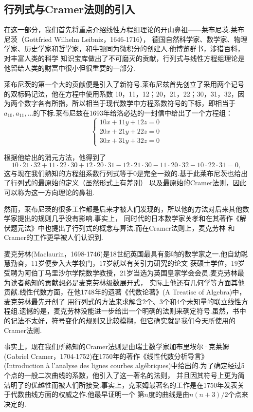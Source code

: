 \subsection{行列式与Cramer法则的引入}
在这一部分，我们首先将重点介绍线性方程组理论的开山鼻祖——莱布尼茨.莱布尼茨（Gottfried Wilhelm Leibniz，1646-1716），
德国自然科学家、数学家、物理学家、历史学家和哲学家，和牛顿同为微积分的创建人.他博览群书，涉猎百科，对丰富人类的科学
知识宝库做出了不可磨灭的贡献，行列式与线性方程组理论是他留给人类的财富中很小但很重要的一部分.

莱布尼茨的第一个大的贡献便是引入了新符号.莱布尼兹首先创立了采用两个记号的双标码记法，他在方程中使用系数
10，11，12；20，21，22；30，31，32，因为两个数字各有所指，所以相当于现代数学中方程系数符号的下标，即相当于
$a_{10},a_{11},\ldots$的下标.莱布尼兹在1693年给洛必达的一封信中给出了一个方程组：
\[\begin{cases}
    10x+11y+12z=0\\
    20x+21y+22z=0\\
    30x+31y+32z=0
\end{cases}\]

根据他给出的消元方法，他得到了
\[10\cdot 21\cdot 32+11\cdot 22\cdot 30+12\cdot 20\cdot 31-12\cdot 21\cdot 30-11\cdot 20\cdot 32-10\cdot 22\cdot 31=0,\]
这与现在我们熟知的方程组系数行列式等于0是完全一致的.基于此莱布尼茨也给出了行列式的最原始的定义（虽然形式上有差别）
以及最原始的Cramer法则，因此可以称为这一方向理论的鼻祖.

然而，莱布尼茨的很多工作都是后来才被人们发现的，所以他的方法对后来其他数学家提出的规则几乎没有影响.事实上，
同时代的日本数学家关孝和在其著作《解伏题元法》中也提出了行列式的概念与算法.而在Cramer法则上，麦克劳林
和Cramer的工作更早被人们认识到.

麦克劳林(Maclaurin，1698-1746)是18世纪英国最具有影响的数学家之一.他自幼聪慧勤奋，11岁便步入大学校门，17岁就以有关引力研究的论文
获硕士学位，19岁受聘为阿伯丁马里沙尔学院数学教授，21岁当选为英国皇家学会会员.麦克劳林最为读者熟知的贡献想必是麦克劳林级数展开式，
实际上他还有几何学等方面其他贡献.线性代数方面，在他1748年的遗著《代数论著》(A Treatise of Algebra)中，麦克劳林最先开创了
用行列式的方法来求解含2个、3个和4个未知量的联立线性方程组.遗憾的是，麦克劳林没能进一步给出一个明确的法则来确定符号.虽然，书中
的记法不太好，符号变化的规则又比较模糊，但它确实就是我们今天所使用的Cramer法则.

事实上，现在我们所熟知的Cramer法则是由瑞士数学家加布里埃尔·克莱姆(Gabriel Cramer，1704-1752)在1750年的著作《线性代数分析导言》
(Introduction à l'analyse des lignes courbes algébriques)中给出的.为了确定经过5个点的一般二次曲线的系数，他引入了这一著名的法则，
并且因其符号上更为简洁明了的优越性而被人们所接受.事实上，克莱姆最著名的工作是在1750年发表关于代数曲线方面的权威之作.他最早证明一个
第$n$度的曲线是由$n(n + 3)/2$个点来决定的.

